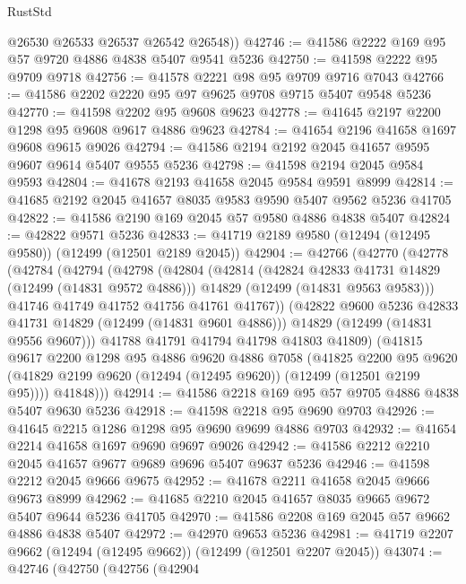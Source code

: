 \begin{lexlean}{RustStd}
\begin{coremodule}
{\begin{coremodule}
{{{{{{{{{{{{{{{{{{{{{{{{{{{{{{{{{{{{{{{{{{{{{{{{{{{{{{{{{{{{{{{{{{{{{{{{{{{{{{{{        @26530
        @26533
        @26537
        @26542
        @26548))
@42746 := @41586 @2222 @169 @95 @57 @9720 @4886 @4838 @5407 @9541 @5236
@42750 := @41598 @2222 @95 @9709 @9718
@42756 := @41578 @2221 @98 @95 @9709 @9716 @7043
@42766 := @41586 @2202 @2220 @95 @97 @9625 @9708 @9715 @5407 @9548 @5236
@42770 := @41598 @2202 @95 @9608 @9623
@42778 := @41645 @2197 @2200 @1298 @95 @9608 @9617 @4886 @9623
@42784 := @41654 @2196 @41658 @1697 @9608 @9615 @9026
@42794 := @41586 @2194 @2192 @2045 @41657 @9595 @9607 @9614 @5407 @9555 @5236
@42798 := @41598 @2194 @2045 @9584 @9593
@42804 := @41678 @2193 @41658 @2045 @9584 @9591 @8999
@42814 := @41685 @2192 @2045 @41657 @8035 @9583 @9590 @5407 @9562 @5236 @41705
@42822 := @41586 @2190 @169 @2045 @57 @9580 @4886 @4838 @5407
@42824 := @42822 @9571 @5236
@42833 := @41719 @2189 @9580 (@12494 (@12495 @9580)) (@12499 (@12501 @2189 @2045))
@42904 := @42766
    (@42770
      (@42778
        (@42784
          (@42794
            (@42798
              (@42804
                (@42814
                  (@42824 @42833 @41731 @14829 (@12499 (@14831 @9572 @4886)))
                  @14829
                  (@12499 (@14831 @9563 @9583)))
                @41746
                @41749
                @41752
                @41756
                @41761
                @41767))
            (@42822 @9600 @5236 @42833 @41731 @14829 (@12499 (@14831 @9601 @4886)))
            @14829
            (@12499 (@14831 @9556 @9607)))
          @41788
          @41791
          @41794
          @41798
          @41803
          @41809)
        (@41815
          @9617
          @2200
          @1298
          @95
          @4886
          @9620
          @4886
          @7058
          (@41825
            @2200
            @95
            @9620
            (@41829 @2199 @9620 (@12494 (@12495 @9620)) (@12499 (@12501 @2199 @95))))
          @41848)))
@42914 := @41586 @2218 @169 @95 @57 @9705 @4886 @4838 @5407 @9630 @5236
@42918 := @41598 @2218 @95 @9690 @9703
@42926 := @41645 @2215 @1286 @1298 @95 @9690 @9699 @4886 @9703
@42932 := @41654 @2214 @41658 @1697 @9690 @9697 @9026
@42942 := @41586 @2212 @2210 @2045 @41657 @9677 @9689 @9696 @5407 @9637 @5236
@42946 := @41598 @2212 @2045 @9666 @9675
@42952 := @41678 @2211 @41658 @2045 @9666 @9673 @8999
@42962 := @41685 @2210 @2045 @41657 @8035 @9665 @9672 @5407 @9644 @5236 @41705
@42970 := @41586 @2208 @169 @2045 @57 @9662 @4886 @4838 @5407
@42972 := @42970 @9653 @5236
@42981 := @41719 @2207 @9662 (@12494 (@12495 @9662)) (@12499 (@12501 @2207 @2045))
@43074 := @42746
    (@42750
      (@42756
        (@42904
}}}}}}}}}}}}}}}}}}}}}}}}}}}}}}}}}}}}}}}}}}}}}}}}}}}}}}}}}}}}}}}}}}}}}}}}}}}}}}}}
\end{coremodule}}
\end{coremodule}
\end{lexlean}
